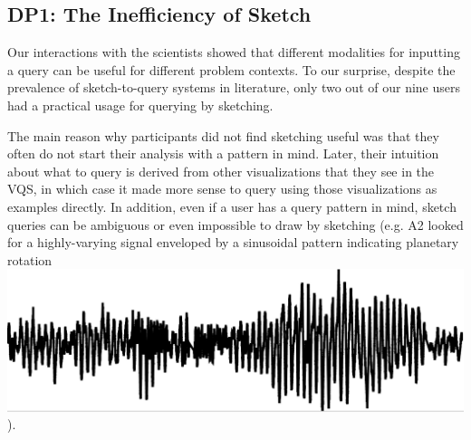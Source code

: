 \subsection{DP1: The Inefficiency of Sketch}
\par Our interactions with the scientists showed that different modalities for inputting a query can be useful for different problem contexts. To our surprise, despite the prevalence of sketch-to-query systems in literature, only two out of our nine users had a practical usage for querying by sketching. %
\par The main reason why participants did not find sketching useful was that they often do not start their analysis with a pattern in mind. Later, their intuition about what to query is derived from other visualizations that they see in the VQS, in which case it made more sense to query using those visualizations as examples directly. In addition, even if a user has a query pattern in mind, sketch queries can be ambiguous or even impossible to draw by sketching (e.g. A2 looked for a highly-varying signal enveloped by a sinusoidal pattern indicating planetary rotation \includegraphics[width=1.55\baselineskip,keepaspectratio]{figures/impossible_sketch.png}).
